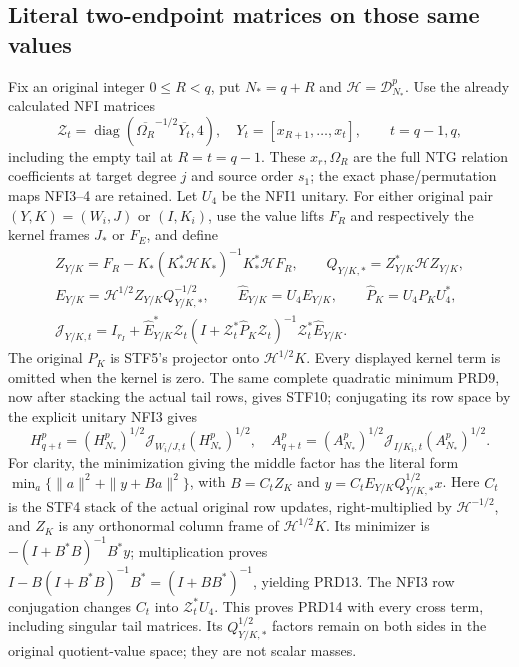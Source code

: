 \subsection{Literal two-endpoint matrices on those same values}
Fix an original integer $0\le R<q$, put $N_*=q+R$ and
$\mathcal H=\mathcal D_{N_*}^p$. Use the already calculated
NFI matrices
\[
 \mathscr Z_t=\operatorname{diag}
 (\overline{\Omega_R}^{-1/2}\overline{Y_t},4),\quad
 Y_t=[x_{R+1},\ldots,x_t],\qquad t=q-1,q,                 \tag{PRD12}
\]
including the empty tail at $R=t=q-1$. These $x_r,\Omega_R$
are the full NTG relation coefficients at target degree $j$ and
source order $s_1$; the exact phase/permutation maps NFI3--4 are
retained. Let $U_4$ be the NFI1 unitary. For either original
pair $(Y,K)=(W_i,J)$ or $(I,K_i)$, use the value lifts $F_R$
and respectively the kernel frames $J_*$ or $F_E$, and define
\[
\begin{gathered}
 Z_{Y/K}=F_R-K_*(K_*^*\mathcal H K_*)^{-1}K_*^*\mathcal H F_R,
 \qquad Q_{Y/K,*}=Z_{Y/K}^*\mathcal H Z_{Y/K},\\
 E_{Y/K}=\mathcal H^{1/2}Z_{Y/K}Q_{Y/K,*}^{-1/2},\qquad
 \widehat E_{Y/K}=U_4E_{Y/K},\qquad
 \widehat P_K=U_4P_KU_4^*,\\
 \mathcal J_{Y/K,t}=I_{r_I}+
 \widehat E_{Y/K}^*\mathscr Z_t
 (I+\mathscr Z_t^*\widehat P_K\mathscr Z_t)^{-1}
 \mathscr Z_t^*\widehat E_{Y/K} .
\end{gathered}                                                    \tag{PRD13}
\]
The original $P_K$ is STF5's projector onto $\mathcal H^{1/2}K$.
Every displayed kernel term is omitted when the kernel is zero.
The same complete quadratic minimum PRD9, now after stacking the
actual tail rows, gives STF10; conjugating its row space by the
explicit unitary NFI3 gives
\[
 H_{q+t}^p=(H_{N_*}^p)^{1/2}\mathcal J_{W_i/J,t}(H_{N_*}^p)^{1/2},
 \quad
 A_{q+t}^p=(A_{N_*}^p)^{1/2}\mathcal J_{I/K_i,t}(A_{N_*}^p)^{1/2}.
                                                               \tag{PRD14}
\]
For clarity, the minimization giving the middle factor has the
literal form $\min_a\{\|a\|^2+\|y+Ba\|^2\}$, with
$B=C_t Z_K$ and $y=C_tE_{Y/K}Q_{Y/K,*}^{1/2}x$.
Here $C_t$ is the STF4 stack of the actual original row updates,
right-multiplied by $\mathcal H^{-1/2}$, and $Z_K$ is any
orthonormal column frame of $\mathcal H^{1/2}K$.
Its minimizer is $-(I+B^*B)^{-1}B^*y$; multiplication proves
$I-B(I+B^*B)^{-1}B^*=(I+BB^*)^{-1}$, yielding PRD13.
The NFI3 row conjugation changes $C_t$ into $\mathscr Z_t^*U_4$.
This proves PRD14 with every cross term, including singular tail
matrices. Its $Q_{Y/K,*}^{1/2}$ factors remain on both sides in
the original quotient-value space; they are not scalar masses.

